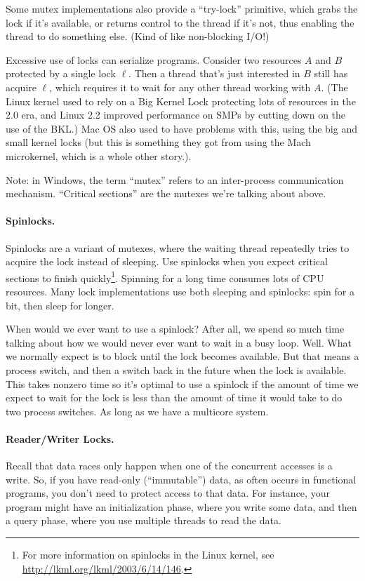 Some mutex implementations also provide a ``try-lock'' primitive,
which grabs the lock if it's available, or returns control to the
thread if it's not, thus enabling the thread to do something else. (Kind of
like non-blocking I/O!)

Excessive use of locks can serialize programs. Consider two resources
$A$ and $B$ protected by a single lock $\ell$. Then a thread that's
just interested in $B$ still has acquire $\ell$, which requires it to
wait for any other thread working with $A$. (The Linux kernel used to
rely on a Big Kernel Lock protecting lots of resources in the 2.0 era,
and Linux 2.2 improved performance on SMPs by cutting down on the use
of the BKL.) Mac OS also used to have problems with this, using the
big and small kernel locks (but this is something they got from using
the Mach microkernel, which is a whole other story.).

Note: in Windows, the term ``mutex'' refers to an inter-process
communication mechanism. ``Critical sections'' are the mutexes we're
talking about above.

\paragraph{Spinlocks.} Spinlocks are a variant of mutexes, where the
waiting thread repeatedly tries to acquire the lock instead of sleeping.
Use spinlocks when you expect critical sections to finish 
quickly\footnote{For more information on spinlocks in the Linux
kernel, see \url{http://lkml.org/lkml/2003/6/14/146}.}. Spinning
for a long time consumes lots of CPU resources. Many lock
implementations use both sleeping and spinlocks: spin for a bit,
then sleep for longer. 

When would we ever want to use a spinlock? After all, we spend so much time talking about how we would never ever want to wait in a busy loop. Well. What we normally expect is to block until the lock becomes available. But that means a process switch, and then a switch back in the future when the lock is available. This takes nonzero time so it's optimal to use a spinlock if the amount of time we expect to wait for the lock is less than the amount of time it would take to do two process switches. As long as we have a multicore system.

\paragraph{Reader/Writer Locks.} Recall that data races only happen when
one of the concurrent accesses is a write. So, if you have read-only
(``immutable'') data, as often occurs in functional programs, you don't need
to protect access to that data. For instance, your program might
have an initialization phase, where you write some data, and then a 
query phase, where you use multiple threads to read the data.


